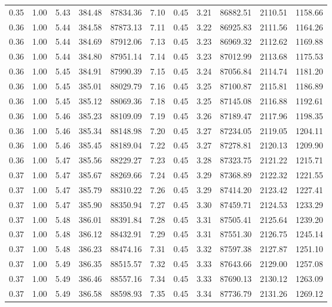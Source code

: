 \begin{table}[!ht]
\begin{tabular}{rrrrrrrrrrr}
0.35 & 1.00 & 5.43 & 384.48 & 87834.36 & 7.10 & 0.45 & 3.21 & 86882.51 & 2110.51 & 1158.66 \\
0.36 & 1.00 & 5.44 & 384.58 & 87873.13 & 7.11 & 0.45 & 3.22 & 86925.83 & 2111.56 & 1164.26 \\
0.36 & 1.00 & 5.44 & 384.69 & 87912.06 & 7.13 & 0.45 & 3.23 & 86969.32 & 2112.62 & 1169.88 \\
0.36 & 1.00 & 5.44 & 384.80 & 87951.14 & 7.14 & 0.45 & 3.23 & 87012.99 & 2113.68 & 1175.53 \\
0.36 & 1.00 & 5.45 & 384.91 & 87990.39 & 7.15 & 0.45 & 3.24 & 87056.84 & 2114.74 & 1181.20 \\
0.36 & 1.00 & 5.45 & 385.01 & 88029.79 & 7.16 & 0.45 & 3.25 & 87100.87 & 2115.81 & 1186.89 \\
0.36 & 1.00 & 5.45 & 385.12 & 88069.36 & 7.18 & 0.45 & 3.25 & 87145.08 & 2116.88 & 1192.61 \\
0.36 & 1.00 & 5.46 & 385.23 & 88109.09 & 7.19 & 0.45 & 3.26 & 87189.47 & 2117.96 & 1198.35 \\
0.36 & 1.00 & 5.46 & 385.34 & 88148.98 & 7.20 & 0.45 & 3.27 & 87234.05 & 2119.05 & 1204.11 \\
0.36 & 1.00 & 5.46 & 385.45 & 88189.04 & 7.22 & 0.45 & 3.27 & 87278.81 & 2120.13 & 1209.90 \\
0.36 & 1.00 & 5.47 & 385.56 & 88229.27 & 7.23 & 0.45 & 3.28 & 87323.75 & 2121.22 & 1215.71 \\
0.37 & 1.00 & 5.47 & 385.67 & 88269.66 & 7.24 & 0.45 & 3.29 & 87368.89 & 2122.32 & 1221.55 \\
0.37 & 1.00 & 5.47 & 385.79 & 88310.22 & 7.26 & 0.45 & 3.29 & 87414.20 & 2123.42 & 1227.41 \\
0.37 & 1.00 & 5.47 & 385.90 & 88350.94 & 7.27 & 0.45 & 3.30 & 87459.71 & 2124.53 & 1233.29 \\
0.37 & 1.00 & 5.48 & 386.01 & 88391.84 & 7.28 & 0.45 & 3.31 & 87505.41 & 2125.64 & 1239.20 \\
0.37 & 1.00 & 5.48 & 386.12 & 88432.91 & 7.29 & 0.45 & 3.31 & 87551.30 & 2126.75 & 1245.14 \\
0.37 & 1.00 & 5.48 & 386.23 & 88474.16 & 7.31 & 0.45 & 3.32 & 87597.38 & 2127.87 & 1251.10 \\
0.37 & 1.00 & 5.49 & 386.35 & 88515.57 & 7.32 & 0.45 & 3.33 & 87643.66 & 2129.00 & 1257.08 \\
0.37 & 1.00 & 5.49 & 386.46 & 88557.16 & 7.34 & 0.45 & 3.33 & 87690.13 & 2130.12 & 1263.09 \\
0.37 & 1.00 & 5.49 & 386.58 & 88598.93 & 7.35 & 0.45 & 3.34 & 87736.79 & 2131.26 & 1269.12 \\

\end{tabular}
\end{table}
